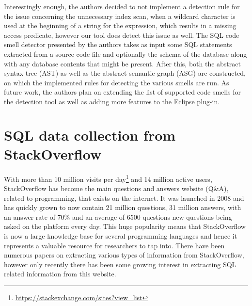 Interestingly enough, the authors decided to not implement a detection rule for the issue concerning the unnecessary index scan, when a wildcard character is used at the beginning of a string for the  expression, which results in a missing access predicate, however our tool does detect this issue as well. The SQL code smell detector presented by the authors takes as input some SQL statements extracted from a source code file and optionally the schema of the database along with any database contents that might be present. After this, both the abstract syntax tree (AST) as well as the abstract semantic graph (ASG) are constructed, on which the implemented rules for detecting the various smells are run. As future work, the authors plan on extending the list of supported code smells for the detection tool as well as adding more features to the Eclipse plug-in.


\section{SQL data collection from StackOverflow}
\label{section:data_collection_from_stack_overflow}

With more than 10 million visits per day\footnote{\url{https://stackexchange.com/sites?view=list}} and 14 million active users, StackOverflow has become the main questions and answers website (Q\&A), related to programming, that exists on the internet. It was launched in 2008 and has quickly grown to now contain 21 million questions, 31 million answers, with an answer rate of 70\% and an average of 6500 questions new questions being asked on the platform every day. This huge popularity means that StackOverflow is now a large knowledge base for several programming languages and hence it represents a valuable resource for researchers to tap into. There have been numerous papers on extracting various types of information from StackOverflow, however only recently there has been some growing interest in extracting SQL related information from this website.


